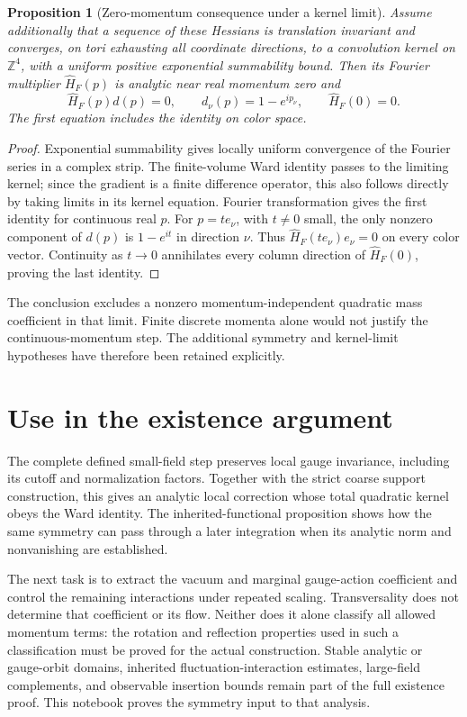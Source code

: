 \documentclass[11pt]{article}
\newtheorem{proposition}[theorem]{Proposition}
\theoremstyle{remark}
\begin{document}
\begin{proposition}[Zero-momentum consequence under a kernel limit]
\label{gc-zero-momentum}
Assume additionally that a sequence of these Hessians is translation
invariant and converges, on tori exhausting all coordinate directions,
to a convolution kernel on $\mathbb Z^4$, with a uniform positive
exponential summability bound. Then its Fourier multiplier
$\widehat H_F(p)$ is analytic near real momentum zero and
\begin{equation}\label{gc-zero}
 \widehat H_F(p)d(p)=0,\qquad
 d_\nu(p)=1-e^{ip_\nu},\qquad \widehat H_F(0)=0.
\end{equation}
The first equation includes the identity on color space.
\end{proposition}
\begin{proof}
Exponential summability gives locally uniform convergence of the
Fourier series in a complex strip. The finite-volume Ward identity
passes to the limiting kernel; since the gradient is a finite
difference operator, this also follows directly by taking limits
in its kernel equation. Fourier transformation gives the first
identity for continuous real $p$.
For $p=t e_\nu$, with $t\ne0$ small, the only nonzero component
of $d(p)$ is $1-e^{it}$ in direction $\nu$. Thus
$\widehat H_F(t e_\nu)e_\nu=0$ on every color vector.
Continuity as $t\to0$ annihilates every column direction of
$\widehat H_F(0)$, proving the last identity.
\end{proof}
The conclusion excludes a nonzero momentum-independent quadratic
mass coefficient in that limit. Finite discrete momenta alone would
not justify the continuous-momentum step. The additional symmetry
and kernel-limit hypotheses have therefore been retained explicitly.

\section{Use in the existence argument}
\label{gc-next}

The complete defined small-field step preserves local gauge
invariance, including its cutoff and normalization factors.
Together with the strict coarse support construction, this gives
an analytic local correction whose total quadratic kernel obeys
the Ward identity. The inherited-functional proposition shows
how the same symmetry can pass through a later integration when
its analytic norm and nonvanishing are established.

The next task is to extract the vacuum and marginal gauge-action
coefficient and control the remaining interactions under repeated
scaling. Transversality does not determine that coefficient or its
flow. Neither does it alone classify all allowed momentum terms:
the rotation and reflection properties used in such a classification
must be proved for the actual construction. Stable analytic or
gauge-orbit domains, inherited fluctuation-interaction estimates,
large-field complements, and observable insertion bounds remain
part of the full existence proof. This notebook proves the symmetry
input to that analysis.
\end{document}
